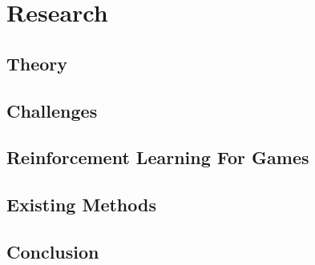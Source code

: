 \chapter{Research}
\label{research}

\section{Theory}

\section{Challenges}

\section{Reinforcement Learning For Games}

\section{Existing Methods}

\section{Conclusion}

